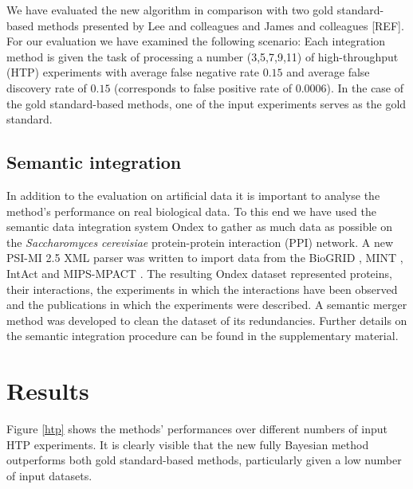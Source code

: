 \documentclass{bioinfo}
\newcommand{\species}[1]{\textit{#1}}
\newcommand{\REF}{{\color{red}[REF]}}
\begin{document}
\begin{methods}
We have evaluated the new algorithm in comparison with two gold standard-based methods presented by Lee and colleagues \citep{lee_probabilistic_2004} and James and colleagues \REF. For our evaluation we have examined the following scenario: Each integration method is given the task of processing a number (3,5,7,9,11) of high-throughput (HTP) experiments with average false negative rate $0.15$ and average false discovery rate of $0.15$ (corresponds to false positive rate of 0.0006). In the case of the gold standard-based methods, one of the input experiments serves as the gold standard.

\subsection{Semantic integration}

In addition to the evaluation on artificial data it is important to analyse the method's performance on real biological data. To this end we have used the semantic data integration system Ondex \citep{koehler_graph-based_2006} to gather as much data as possible on the \species{Saccharomyces cerevisiae} protein-protein interaction (PPI) network. A new PSI-MI 2.5 XML \citep{kerrien_broadening_2007} parser was written to import data from the BioGRID \citep{breitkreutz_biogrid_2008}, MINT \citep{chatr-aryamontri_mint:_2007}, IntAct \citep{hermjakob_intact:_2004} and MIPS-MPACT \citep{guldener_mpact:_2006}. The resulting Ondex dataset represented proteins, their interactions, the experiments in which the interactions have been observed and the publications in which the experiments were described. A semantic merger method was developed to clean the dataset of its redundancies. Further details on the semantic integration procedure can be found in the supplementary material.

\end{methods}

\section{Results}

Figure \ref{htp} shows the methods' performances over different numbers of input HTP experiments. It is clearly visible that the new fully Bayesian method outperforms both gold standard-based methods, particularly given a low number of input datasets.
\end{document}
